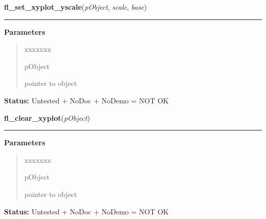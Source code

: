 \hspace{.8\funcindent}\begin{boxedminipage}{\funcwidth}

    \raggedright \textbf{fl\_set\_xyplot\_yscale}(\textit{pObject}, \textit{scale}, \textit{base})

    \vspace{-1.5ex}

    \rule{\textwidth}{0.5\fboxrule}
\setlength{\parskip}{2ex}
\setlength{\parskip}{1ex}
      \textbf{Parameters}
      \vspace{-1ex}

      \begin{quote}
        \begin{Ventry}{xxxxxxx}

          \item[pObject]

          pointer to object

        \end{Ventry}

      \end{quote}

\textbf{Status:} Untested + NoDoc + NoDemo = NOT OK



    \end{boxedminipage}

    \label{xformslib:library:fl_clear_xyplot}

    \vspace{0.5ex}

\hspace{.8\funcindent}\begin{boxedminipage}{\funcwidth}

    \raggedright \textbf{fl\_clear\_xyplot}(\textit{pObject})

    \vspace{-1.5ex}

    \rule{\textwidth}{0.5\fboxrule}
\setlength{\parskip}{2ex}
\setlength{\parskip}{1ex}
      \textbf{Parameters}
      \vspace{-1ex}

      \begin{quote}
        \begin{Ventry}{xxxxxxx}

          \item[pObject]

          pointer to object

        \end{Ventry}

      \end{quote}

\textbf{Status:} Untested + NoDoc + NoDemo = NOT OK



    \end{boxedminipage}

